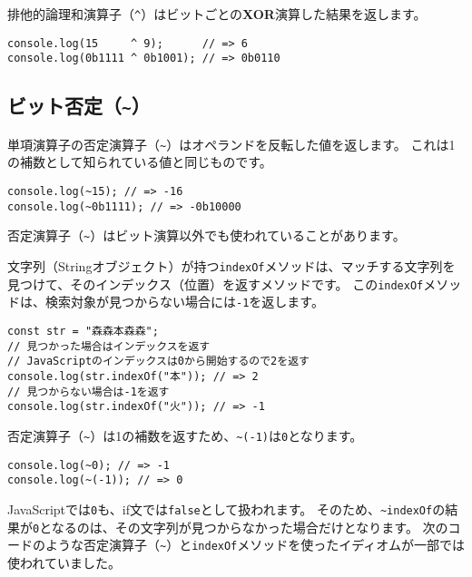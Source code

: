 排他的論理和演算子（\texttt{\^{}}）はビットごとの\textbf{XOR}演算した結果を返します。

\begin{lstlisting}
console.log(15     ^ 9);      // => 6
console.log(0b1111 ^ 0b1001); // => 0b0110
\end{lstlisting}

\hypertarget{bit-not}{%
\subsection{\texorpdfstring{ビット否定（\texttt{\textasciitilde{}}）}{ビット否定（\textasciitilde{}）}}\label{bit-not}}

単項演算子の否定演算子（\lstinline{~}）はオペランドを反転した値を返します。
これは1の補数として知られている値と同じものです。

\begin{lstlisting}
console.log(~15); // => -16
console.log(~0b1111); // => -0b10000
\end{lstlisting}

否定演算子（\lstinline{~}）はビット演算以外でも使われていることがあります。

文字列（Stringオブジェクト）が持つ\texttt{indexOf}メソッドは、マッチする文字列を見つけて、そのインデックス（位置）を返すメソッドです。
この\texttt{indexOf}メソッドは、検索対象が見つからない場合には\texttt{-1}を返します。

\begin{lstlisting}
const str = "森森本森森";
// 見つかった場合はインデックスを返す
// JavaScriptのインデックスは0から開始するので2を返す
console.log(str.indexOf("本")); // => 2
// 見つからない場合は-1を返す
console.log(str.indexOf("火")); // => -1
\end{lstlisting}

否定演算子（\lstinline{~}）は1の補数を返すため、\lstinline{~(-1)}は\texttt{0}となります。

\begin{lstlisting}
console.log(~0); // => -1
console.log(~(-1)); // => 0
\end{lstlisting}

JavaScriptでは\texttt{0}も、if文では\texttt{false}として扱われます。
そのため、\lstinline{~indexOf}の結果が\texttt{0}となるのは、その文字列が見つからなかった場合だけとなります。
次のコードのような否定演算子（\lstinline{~}）と\texttt{indexOf}メソッドを使ったイディオムが一部では使われていました。


